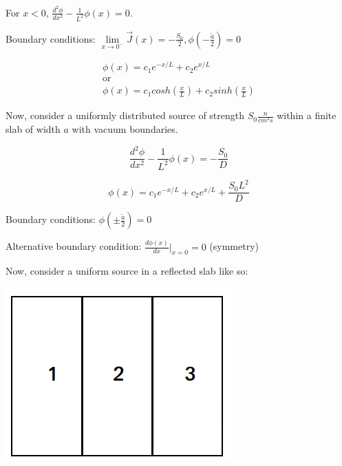 \documentclass[12pt]{article}
\begin{document}
For $x < 0$, $\frac{d^2\phi}{dx^2} - \frac{1}{L^2}\phi(x) = 0$.

Boundary conditions: 
$\lim\limits_{x\rightarrow 0^-}\vec{J}(x) = -\frac{S_0}{2}, \phi(-\tfrac{\tilde{a}}{2}) = 0$

\begin{gather*}
\phi(x) = c_1e^{-x/L} + c_2e^{x/L} \\
\text{or} \\
\phi(x) = c_1cosh(\tfrac{x}{L}) + c_2sinh(\tfrac{x}{L})
\end{gather*}


Now, consider a uniformly distributed source of strength $S_0 \tfrac{n}{cm^3s}$ within a finite slab of
width $a$ with vacuum boundaries.

\begin{equation*}
\frac{d^2\phi}{dx^2} - \frac{1}{L^2}\phi(x) = -\frac{S_0}{D}
\end{equation*}

\begin{equation*}
\phi(x) = c_1e^{-x/L} + c_2e^{x/L} + \frac{S_0L^2}{D}
\end{equation*}

Boundary conditions: $\phi(\pm\tfrac{\tilde{a}}{2}) = 0$


Alternative boundary condition: $\frac{d\phi(x)}{dx}\Bigr|_{x = 0} = 0$ (symmetry)


Now, consider a uniform source in a reflected slab like so:

\begin{center}
\includegraphics[height=2.5 in]{../figs/ref_slab}
\end{center}
\end{document}
